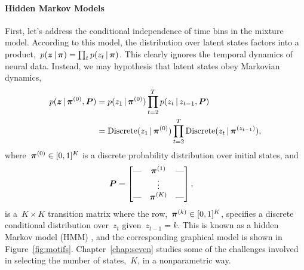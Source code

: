 
\paragraph{Hidden Markov Models}
First, let's address the conditional independence of time bins in the
mixture model. According to this model, the distribution over latent
states factors into a product,~${p(\boldsymbol{z} \,|\, \boldsymbol{\pi}) = \prod_t p(z_t
  \,|\, \boldsymbol{\pi})}$.  This clearly ignores the temporal dynamics of
neural data. Instead, we may hypothesis that latent states obey
Markovian dynamics,
\begin{align*}
  p(\boldsymbol{z} \,|\, \boldsymbol{\pi}^{(0)}, \boldsymbol{P}) &= p(z_1 \,|\, \boldsymbol{\pi}^{(0)}) \prod_{t=2}^T p(z_t \,|\, z_{t-1}, \boldsymbol{P}) \\ 
  &= \mathrm{Discrete}(z_1 \,|\, \boldsymbol{\pi}^{(0)}) \prod_{t=2}^T \mathrm{Discrete}(z_t \,|\, \boldsymbol{\pi}^{(z_{t-1})}),
\end{align*}
where~$\boldsymbol{\pi}^{(0)} \in [0,1]^K$ is a discrete probability distribution over
initial states, and
\begin{align*}
  \boldsymbol{P} &=
        \begin{bmatrix}
          \text{---} &  \boldsymbol{\pi}^{(1)}  & \text{---} \\
            &  \vdots &   \\
          \text{---} &  \boldsymbol{\pi}^{(K)}  & \text{---}
        \end{bmatrix},
\end{align*}
is a~${K \times K}$ transition matrix where the
row,~${\boldsymbol{\pi}^{(k)} \in [0,1]^K}$, specifies a discrete conditional
distribution over~$z_t$ given~${z_{t-1}=k}$.  This is known as a
hidden Markov model (HMM) \citep{baum1966statistical,
  rabiner1989tutorial}, and the corresponding graphical model is shown
in Figure~\ref{fig:motifs}. Chapter~\ref{chap:seven} studies some of
the challenges involved in selecting the number of states,~$K$, in a
nonparametric way.

